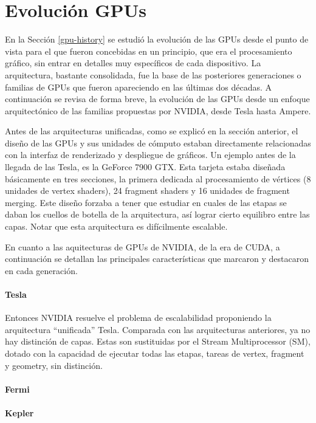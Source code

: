 \chapter{Evolución GPUs}\label{AneB}

En la Sección \ref{gpu-history} se estudió la evolución de las GPUs desde el punto de vista para el que fueron concebidas en un principio, que era el procesamiento gráfico, sin entrar en detalles muy específicos de cada dispositivo. La arquitectura, bastante consolidada, fue la base de las posteriores generaciones o familias de GPUs que fueron apareciendo en las últimas dos décadas. A continuación se revisa de forma breve, la evolución de las GPUs desde un enfoque arquitectónico de las familias propuestas por NVIDIA, desde Tesla hasta Ampere.

Antes de las arquitecturas unificadas, como se explicó en la  sección anterior, el diseño de las GPUs y sus unidades de cómputo estaban directamente relacionadas con la interfaz de renderizado y despliegue de gráficos. Un ejemplo antes de la llegada de las Tesla, es la GeForce 7900 GTX. Esta tarjeta estaba diseñada básicamente en tres secciones, la primera dedicada al procesamiento de vértices (8 unidades de vertex shaders), 24 fragment shaders y 16 unidades de fragment merging. Este diseño forzaba a tener que estudiar en cuales de las etapas se daban los cuellos de botella de la arquitectura, así lograr cierto equilibro entre las capas. Notar que esta arquitectura es difícilmente escalable.

En cuanto a las aquitecturas de GPUs de NVIDIA, de la era de CUDA, a continuación se detallan las principales características que marcaron y destacaron en cada generación.

\subsubsection*{Tesla}
Entonces NVIDIA resuelve el problema de escalabilidad proponiendo la arquitectura ``unificada'' Tesla. Comparada con las arquitecturas anteriores, ya no hay distinción de capas. Estas son sustituidas por el Stream Multiprocessor (SM), dotado con la capacidad de ejecutar todas las etapas, tareas de vertex, fragment y geometry, sin distinción.


\subsubsection*{Fermi}

\subsubsection*{Kepler}

